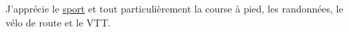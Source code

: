 
\footnotesize
J'apprécie le {\color{awesome-skyblue}
\href{https://www.strava.com/athletes/12545027}{sport}} et tout particulièrement
la course à pied, les randonnées, le vélo de route et le VTT.
